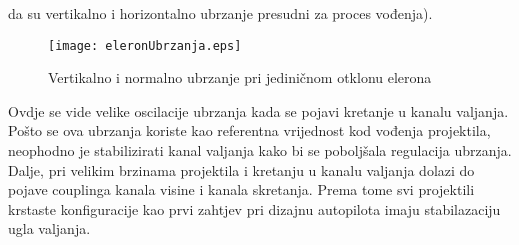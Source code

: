 da su vertikalno i horizontalno ubrzanje presudni za proces vođenja).  
\begin{figure}[!ht]
    \centering
    \texttt{[image: eleronUbrzanja.eps]}
    \caption{Vertikalno i normalno ubrzanje pri jediničnom otklonu elerona}
    \label{fig:eleronUbrzanja}
\end{figure}
Ovdje se vide velike oscilacije ubrzanja kada se pojavi kretanje u kanalu valjanja. Pošto se 
ova ubrzanja koriste kao referentna vrijednost kod vođenja projektila, neophodno je stabilizirati 
kanal valjanja kako bi se poboljšala regulacija ubrzanja. 
Dalje, pri velikim brzinama projektila i kretanju u kanalu valjanja dolazi do pojave couplinga 
kanala visine i kanala skretanja. Prema tome svi projektili krstaste konfiguracije 
kao prvi zahtjev pri dizajnu autopilota imaju stabilazaciju ugla valjanja. 
